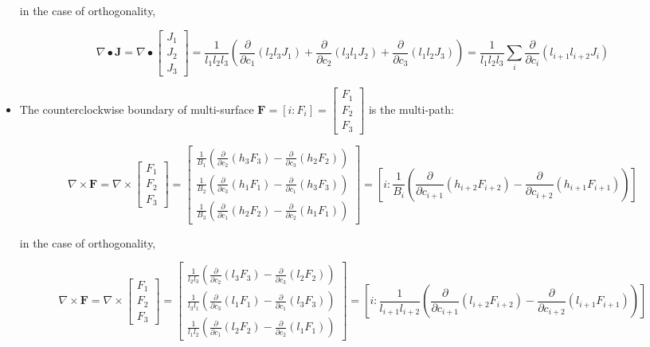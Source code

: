 \documentclass{book}
\begin{document}
\begin{itemize}
in the case of orthogonality, 

\[\nabla \bullet \mathbf{J} = \nabla \bullet \begin{bmatrix} J_1 \\ J_2 \\ J_3 \end{bmatrix} = \frac{1}{l_1 l_2 l_3}\left(\frac{\partial}{\partial c_1}(l_2 l_3 J_1) + \frac{\partial}{\partial c_2}(l_3 l_1 J_2) + \frac{\partial}{\partial c_3}(l_1 l_2 J_3)\right) = \frac{1}{l_1 l_2 l_3}\sum_i \frac{\partial}{\partial c_i} (l_{i+1} l_{i+2} J_i)\]


\item The counterclockwise boundary of multi-surface \(\mathbf{F} = [i : F_i] = \begin{bmatrix} F_1 \\ F_2 \\ F_3 \end{bmatrix}\) is the multi-path:

\[\nabla \times \mathbf{F} = \nabla \times \begin{bmatrix} F_1 \\ F_2 \\ F_3 \end{bmatrix} = \begin{bmatrix} \frac{1}{B_1}\left(\frac{\partial}{\partial c_2}(h_3 F_3) - \frac{\partial}{\partial c_3}(h_2 F_2)\right) \\ \frac{1}{B_2}\left(\frac{\partial}{\partial c_3}(h_1 F_1) - \frac{\partial}{\partial c_1}(h_3 F_3)\right) \\ \frac{1}{B_3}\left(\frac{\partial}{\partial c_1}(h_2 F_2) - \frac{\partial}{\partial c_2}(h_1 F_1)\right) \end{bmatrix} = \left[ i : \frac{1}{B_i}\left(\frac{\partial}{\partial c_{i+1}}(h_{i+2} F_{i+2}) - \frac{\partial}{\partial c_{i+2}}(h_{i+1} F_{i+1})\right) \right]\]

in the case of orthogonality, 

\[\nabla \times \mathbf{F} = \nabla \times \begin{bmatrix} F_1 \\ F_2 \\ F_3 \end{bmatrix} = \begin{bmatrix} \frac{1}{l_2 l_3}\left(\frac{\partial}{\partial c_2}(l_3 F_3) - \frac{\partial}{\partial c_3}(l_2 F_2)\right) \\ \frac{1}{l_3 l_1}\left(\frac{\partial}{\partial c_3}(l_1 F_1) - \frac{\partial}{\partial c_1}(l_3 F_3)\right) \\ \frac{1}{l_1 l_2}\left(\frac{\partial}{\partial c_1}(l_2 F_2) - \frac{\partial}{\partial c_2}(l_1 F_1)\right) \end{bmatrix} = \left[ i : \frac{1}{l_{i+1} l_{i+2}}\left(\frac{\partial}{\partial c_{i+1}}(l_{i+2} F_{i+2}) - \frac{\partial}{\partial c_{i+2}}(l_{i+1} F_{i+1})\right) \right]\]


\end{itemize}
\end{document}

